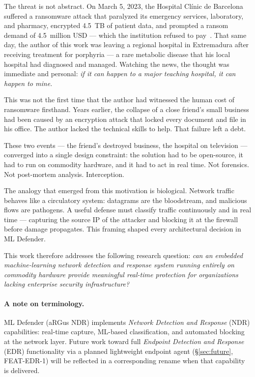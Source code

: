 \documentclass[11pt,a4paper]{article}
\begin{document}
    The threat is not abstract. On March 5, 2023, the Hospital Cl\'inic de Barcelona suffered a
    ransomware attack that paralyzed its emergency services, laboratory, and pharmacy, encrypted
    4.5~TB of patient data, and prompted a ransom demand of 4.5~million USD --- which the
    institution refused to pay~\cite{incibe2023}. That same day, the author of this work was
    leaving a regional hospital in Extremadura after receiving treatment for porphyria --- a rare
    metabolic disease that his local hospital had diagnosed and managed. Watching the news, the
    thought was immediate and personal: \emph{if it can happen to a major teaching hospital, it
    can happen to mine.}

    This was not the first time that the author had witnessed the human cost of ransomware
    firsthand. Years earlier, the collapse of a close friend's small business had been caused by
    an encryption attack that locked every document and file in his office. The author lacked the
    technical skills to help. That failure left a debt.

    These two events --- the friend's destroyed business, the hospital on television ---
    converged into a single design constraint: the solution had to be open-source, it had to run
    on commodity hardware, and it had to act in real time. Not forensics. Not post-mortem
    analysis. Interception.

    The analogy that emerged from this motivation is biological. Network traffic behaves like a
    circulatory system: datagrams are the bloodstream, and malicious flows are pathogens. A
    useful defense must classify traffic continuously and in real time --- capturing the source IP
    of the attacker and blocking it at the firewall before damage propagates. This framing shaped
    every architectural decision in ML Defender.

    This work therefore addresses the following research question: \emph{can an embedded
    machine-learning network detection and response system running entirely on commodity hardware
    provide meaningful real-time protection for organizations lacking enterprise security
    infrastructure?}

    \paragraph{A note on terminology.}
    ML Defender (aRGus NDR) implements \emph{Network Detection and Response} (NDR) capabilities:
    real-time capture, ML-based classification, and automated blocking at the network layer.
    Future work toward full \emph{Endpoint Detection and Response} (EDR) functionality via a
    planned lightweight endpoint agent (\S\ref{sec:future}, FEAT-EDR-1) will be reflected in a
    corresponding rename when that capability is delivered.
\end{document}
